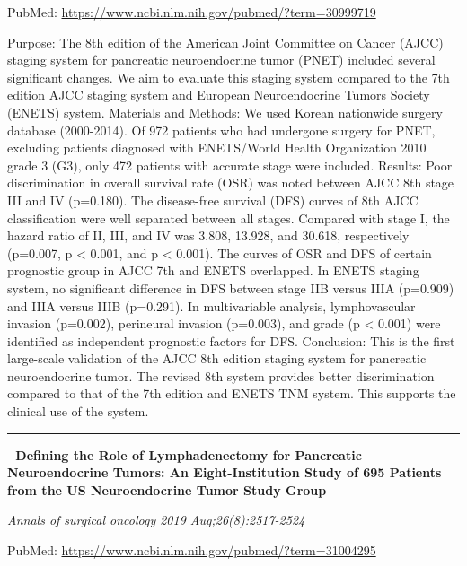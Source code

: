 \documentclass[]{article}
\begin{document}
PubMed: \url{https://www.ncbi.nlm.nih.gov/pubmed/?term=30999719}

Purpose: The 8th edition of the American Joint Committee on Cancer
(AJCC) staging system for pancreatic neuroendocrine tumor (PNET)
included several significant changes. We aim to evaluate this staging
system compared to the 7th edition AJCC staging system and European
Neuroendocrine Tumors Society (ENETS) system. Materials and Methods: We
used Korean nationwide surgery database (2000-2014). Of 972 patients who
had undergone surgery for PNET, excluding patients diagnosed with
ENETS/World Health Organization 2010 grade 3 (G3), only 472 patients
with accurate stage were included. Results: Poor discrimination in
overall survival rate (OSR) was noted between AJCC 8th stage III and IV
(p=0.180). The disease-free survival (DFS) curves of 8th AJCC
classification were well separated between all stages. Compared with
stage I, the hazard ratio of II, III, and IV was 3.808, 13.928, and
30.618, respectively (p=0.007, p \textless{} 0.001, and p \textless{}
0.001). The curves of OSR and DFS of certain prognostic group in AJCC
7th and ENETS overlapped. In ENETS staging system, no significant
difference in DFS between stage IIB versus IIIA (p=0.909) and IIIA
versus IIIB (p=0.291). In multivariable analysis, lymphovascular
invasion (p=0.002), perineural invasion (p=0.003), and grade (p
\textless{} 0.001) were identified as independent prognostic factors for
DFS. Conclusion: This is the first large-scale validation of the AJCC
8th edition staging system for pancreatic neuroendocrine tumor. The
revised 8th system provides better discrimination compared to that of
the 7th edition and ENETS TNM system. This supports the clinical use of
the system.

{}

{}

\begin{center}\rule{0.5\linewidth}{\linethickness}\end{center}

 - \textbf{Defining the Role of Lymphadenectomy for Pancreatic
Neuroendocrine Tumors: An Eight-Institution Study of 695 Patients from
the US Neuroendocrine Tumor Study Group}

\emph{Annals of surgical oncology 2019 Aug;26(8):2517-2524}

PubMed: \url{https://www.ncbi.nlm.nih.gov/pubmed/?term=31004295}
\end{document}
